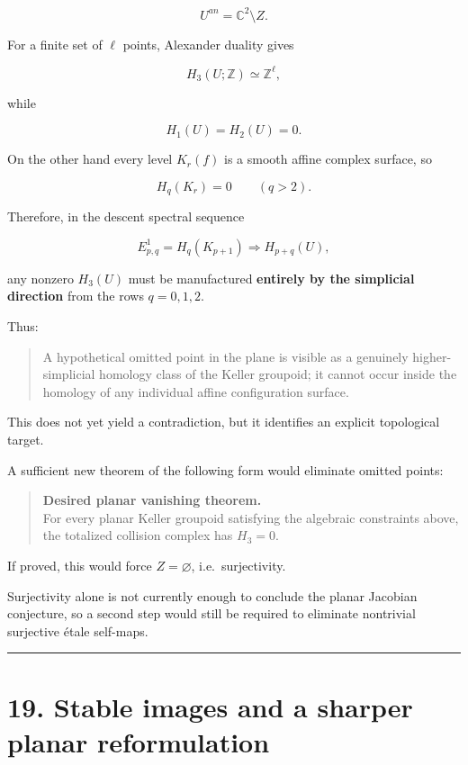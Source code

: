 \[
U^{an}=\mathbb C^2\setminus Z.
\]

For a finite set of \(\ell\) points, Alexander duality gives

\[
H_3(U;\mathbb Z)\simeq\mathbb Z^\ell,
\]

while

\[
H_1(U)=H_2(U)=0.
\]

On the other hand every level \(K_r(f)\) is a smooth affine complex
surface, so

\[
H_q(K_r)=0\qquad(q>2).
\]

Therefore, in the descent spectral sequence

\[
E^1_{p,q}=H_q(K_{p+1})
\Longrightarrow H_{p+q}(U),
\]

any nonzero \(H_3(U)\) must be manufactured \textbf{entirely by the
simplicial direction} from the rows \(q=0,1,2\).

Thus:

\begin{quote}
A hypothetical omitted point in the plane is visible as a genuinely
higher-simplicial homology class of the Keller groupoid; it cannot occur
inside the homology of any individual affine configuration surface.
\end{quote}

This does not yet yield a contradiction, but it identifies an explicit
topological target.

A sufficient new theorem of the following form would eliminate omitted
points:

\begin{quote}
\textbf{Desired planar vanishing theorem.}\\
For every planar Keller groupoid satisfying the algebraic constraints
above, the totalized collision complex has \(H_3=0\).
\end{quote}

If proved, this would force \(Z=\varnothing\), i.e.~surjectivity.

Surjectivity alone is not currently enough to conclude the planar
Jacobian conjecture, so a second step would still be required to
eliminate nontrivial surjective étale self-maps.

\begin{center}\rule{0.5\linewidth}{0.5pt}\end{center}

\section{19. Stable images and a sharper planar
reformulation}\label{stable-images-and-a-sharper-planar-reformulation}

